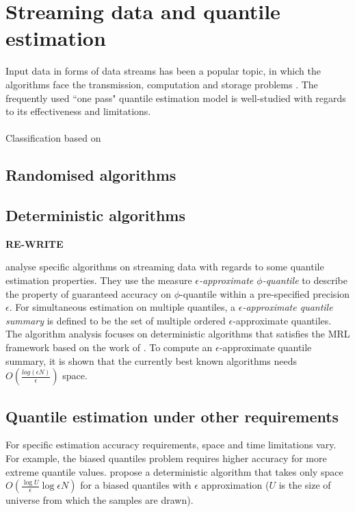 \documentclass[12pt]{article}
\begin{document}
    \section{Streaming data and quantile estimation}
    Input data in forms of data streams has been a popular topic, in which the algorithms face the transmission, computation and storage problems \cite{muthukrishnanDataStreamsAlgorithms2005}. The frequently used ``one pass" quantile estimation model is well-studied with regards to its effectiveness and limitations.
    \\\\
    Classification based on \cite{buragohainQuantilesStreams2009}
    \subsection{Randomised algorithms}
    \subsection{Deterministic algorithms}
    \textbf{RE-WRITE } 

    \citeauthor{greenwaldQuantilesEquidepthHistograms2016a}\cite{greenwaldQuantilesEquidepthHistograms2016a} analyse specific algorithms on streaming data with regards to some quantile estimation properties. 
    They use the measure \textit{$\epsilon$-approximate $\phi$-quantile} to describe the property of guaranteed accuracy on $\phi$-quantile within a pre-specified precision $\epsilon$. 
    For simultaneous estimation on multiple quantiles, a \textit{$\epsilon$-approximate quantile summary} is defined to be the set of multiple ordered $\epsilon$-approximate quantiles.
    The algorithm analysis focuses on deterministic algorithms that satisfies the MRL framework based on the work of \citeauthor{mankuApproximateMediansOthera} \cite{mankuApproximateMediansOthera}. To compute an $\epsilon$-approximate quantile summary, it is shown that the currently best known algorithms needs $O(\frac{log(\epsilon N)} {\epsilon})$ space.

    \subsection{Quantile estimation under other requirements}

    For specific estimation accuracy requirements, space and time limitations vary. For example, the biased quantiles problem requires higher accuracy for more extreme quantile values. \citeauthor{cormodeSpaceTimeefficientDeterministic2006} \cite{cormodeSpaceTimeefficientDeterministic2006} propose a deterministic algorithm that takes only space $O(\frac{\log {U}}{\epsilon} \log {\epsilon N})$ for a biased quantiles with $\epsilon$ approximation ($U$ is the size of universe from which the samples are drawn). 
\end{document}
